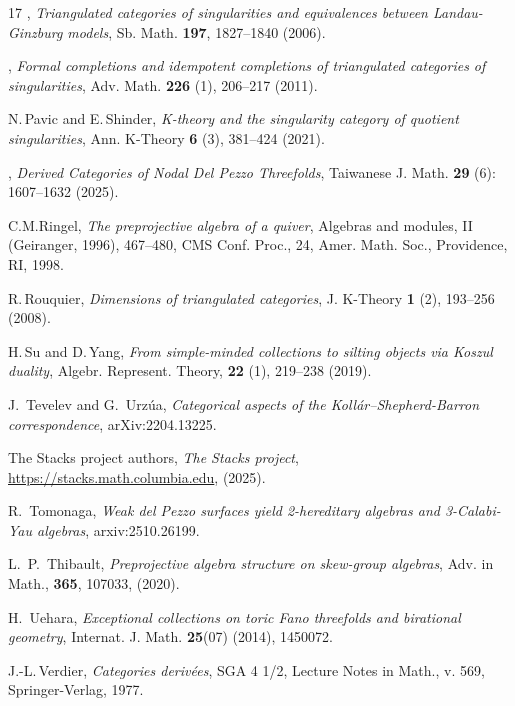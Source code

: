 \documentclass[a4paper,11pt, reqno]{amsart}
\theoremstyle{plain}
\theoremstyle{definition}
\numberwithin{equation}{section}
\begin{document}
\begin{thebibliography}{17}
\bysame , 
{\it Triangulated categories of singularities and equivalences between Landau-Ginzburg models}, 
Sb. Math. \textbf{197}, 1827--1840 (2006).

\bysame , 
{\it Formal completions and idempotent completions of triangulated categories of singularities}, 
Adv. Math. \textbf{226} (1), 206--217 (2011).

N.\,Pavic and E.\,Shinder,
{\it K-theory and the singularity category of quotient singularities},
Ann. K-Theory \textbf{6} (3), 381--424 (2021).

 \bysame, \emph{Derived Categories of Nodal Del Pezzo Threefolds},
Taiwanese J. Math. \textbf{29} (6): 1607--1632 (2025). 

 C.M.Ringel, {\it The preprojective algebra of a quiver}, Algebras and modules, II (Geiranger, 1996), 
467--480, CMS Conf. Proc., 24, Amer. Math. Soc., Providence, RI, 1998.



R.\,Rouquier,
{\it Dimensions of triangulated categories},
J. K-Theory \textbf{1} (2), 193--256 (2008).


H.\,Su and D.\,Yang,
{\it From simple-minded collections to silting objects via Koszul duality},
Algebr. Represent. Theory, \textbf{22} (1), 219--238 (2019).




 J.~Tevelev and G.~Urzúa, \emph{Categorical aspects of the Kollár--Shepherd-Barron correspondence}, arXiv:2204.13225.




 {The {Stacks project authors}}, \emph{The Stacks project}, {\url{https://stacks.math.columbia.edu}},
(2025). 



R.~Tomonaga, {\it Weak del Pezzo surfaces yield 2-hereditary algebras and 3-Calabi-Yau algebras}, arxiv:2510.26199.


 L.~P.~Thibault, {\it Preprojective algebra structure on skew-group algebras}, Adv. in Math., {\bf 365}, 107033, (2020).

 H.~Uehara, {\it Exceptional collections on toric Fano threefolds and birational geometry}, Internat. J. Math. {\bf 25}(07) (2014),
1450072.


J.-L.\,Verdier, 
{\it Categories deriv\'ees}, 
SGA 4 1/2, Lecture Notes in Math., v. 569, Springer-Verlag, 1977.






\end{thebibliography}
\end{document}
